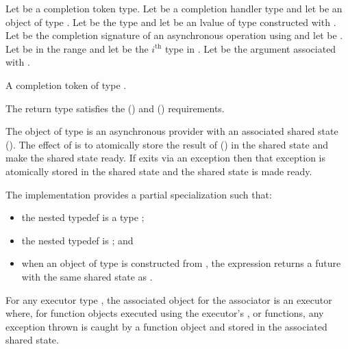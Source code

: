 \begin{itemdescr}
\pnum
Let  be a completion token type. Let  be a completion handler type and let  be an object of type . Let  be the type  and let  be an lvalue of type  constructed with . Let  be the completion signature of an asynchronous operation using  and let  be . Let  be in the range  and let  be the $i^\text{th}$ type in . Let  be the argument associated with .

\pnum
\returns A completion token  of type .

\pnum
\remarks The return type  satisfies the  () and  () requirements.

\pnum
The object  of type  is an asynchronous provider with an associated shared state (). The effect of  is to atomically store the result of  () in the shared state and make the shared state ready. If  exits via an exception then that exception is atomically stored in the shared state and the shared state is made ready.

\pnum
The implementation provides a partial specialization  such that:
\begin{itemize}
\item
 the nested typedef  is a type ;
\item
 the nested typedef  is ; and
\item
 when an object  of type  is constructed from , the expression  returns a future with the same shared state as .
\end{itemize}

\pnum
For any executor type , the associated object for the associator  is an executor where, for function objects executed using the executor's ,  or  functions, any exception thrown is caught by a function object and stored in the associated shared state.
\end{itemdescr}



